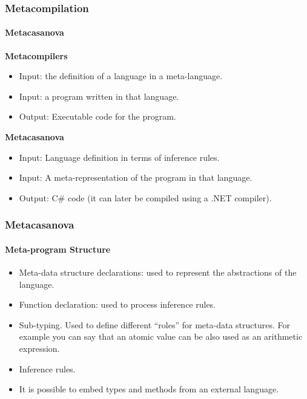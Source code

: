 \documentclass[10pt,a4paper]{beamer}
\begin{document}
\begin{frame}
\frametitle{Metacompilation}
\framesubtitle{Metacasanova}

\textbf{Metacompilers}
\begin{itemize}
	\item Input: the definition of a language in a meta-language.
	\item Input: a program written in that language.
	\item Output: Executable code for the program.
\end{itemize}

\textbf{Metacasanova}
\begin{itemize}
	\item Input: Language definition in terms of inference rules.
	\item Input: A meta-representation of the program in that language.
	\item Output: C\# code (it can later be compiled using a .NET compiler).
\end{itemize}
\end{frame}

\begin{frame}
\frametitle{Metacasanova}
\framesubtitle{Meta-program Structure}

\begin{itemize}
	\item Meta-data structure declarations: used to represent the abstractions of the language.
	\item Function declaration: used to process inference rules.
	\item Sub-typing. Used to define different ``roles'' for meta-data structures. For example you can say that an atomic value can be also used as an arithmetic expression.
	\item Inference rules.
	\item It is possible to embed types and methods from an external language.
\end{itemize}
\end{frame}
\end{document}
